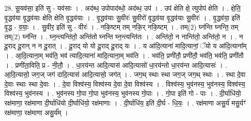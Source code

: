 \documentclass[17pt]{extarticle}
\begin{document}
28. सू॒यव॑सा॒ इति॑ सु - यव॑साः । . अद॑ब्ध॒ उपोपाद॑ब्धो॒ अद॑ब्ध॒ उप॑ । . उप॑ क्षेति क्षे॒ त्युपोप॑ क्षेति । . क्षे॒ति॒ वृ॒द्धव॑या वृ॒द्धव॑याः क्षेति क्षेति वृ॒द्धव॑याः । . वृ॒द्धव॑याः सु॒वीरः॑ सु॒वीरो॑ वृ॒द्धव॑या वृ॒द्धव॑याः सु॒वीरः॑ । . वृ॒द्धव॑या॒ इति॑ वृ॒द्ध - व॒याः॒ । . सु॒वीर॒ इति॑ सु - वीरः॑ । . नकि॒ष्टम् तम् नकि॒र् नकि॒ष्टम् । . तम्(2) घ्न॑न्ति घ्नन्ति॒ तम् तम्(2) घ्न॑न्ति । . घ्न॒न्त्यन्ति॑तो॒ अन्ति॑तो घ्नन्ति घ्न॒न्त्यन्ति॑तः । . अन्ति॑तो॒ न नान्ति॑तो॒ अन्ति॑तो॒ न । . न दू॒राद् दू॒रान् न न दू॒रात् । . दू॒राद् यो यो दू॒राद् दू॒राद् यः । . य आ॑दि॒त्याना॑ मादि॒त्यानां॒ ॅयो य आ॑दि॒त्याना᳚म् । . आ॒दि॒त्याना॒म् भव॑ति॒ भव॑ त्यादि॒त्याना॑ मादि॒त्याना॒म् भव॑ति । . भव॑ति॒ प्रणी॑तौ॒ प्रणी॑तौ॒ भव॑ति॒ भव॑ति॒ प्रणी॑तौ । . प्रणी॑ता॒विति॒ प्र - नी॒तौ॒ । . धा॒रय॑न्त आदि॒त्यास॑ आदि॒त्यासो॑ धा॒रय॑न्तो धा॒रय॑न्त आदि॒त्यासः॑ । . आ॒दि॒त्यासो॒ जग॒ज् जग॑ दादि॒त्यास॑ आदि॒त्यासो॒ जग॑त् । . जग॒थ् स्थाः स्था जग॒ज् जग॒थ् स्थाः । . स्था दे॒वा दे॒वाः स्थाः स्था दे॒वाः । . दे॒वा विश्व॑स्य॒ विश्व॑स्य दे॒वा दे॒वा विश्व॑स्य । . विश्व॑स्य॒ भुव॑नस्य॒ भुव॑नस्य॒ विश्व॑स्य॒ विश्व॑स्य॒ भुव॑नस्य । . भुव॑नस्य गो॒पा गो॒पा भुव॑नस्य॒ भुव॑नस्य गो॒पाः । . गो॒पा इति॑ गो - पाः । . दी॒र्घाधि॑यो॒ रक्ष॑माणा॒ रक्ष॑माणा दी॒र्घाधि॑यो दी॒र्घाधि॑यो॒ रक्ष॑माणाः । . दी॒र्घाधि॑य॒ इति॑ दी॒र्घ - धि॒यः॒ । . रक्ष॑माणा असु॒र्य॑ मसु॒र्यꣳ॑ रक्ष॑माणा॒ रक्ष॑माणा असु॒र्य᳚म् । \newline
\end{document}
